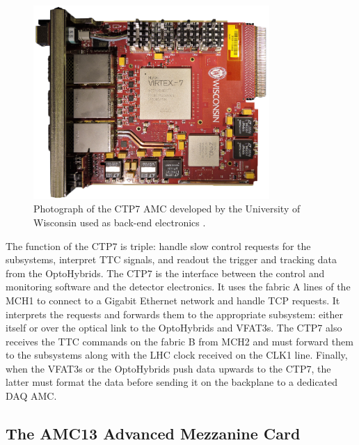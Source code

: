      \begin{figure}[t!]
        \centering
        \includegraphics[width=0.8\textwidth]{img/II-2-daq/ctp7.png}
        \caption{Photograph of the CTP7 AMC developed by the University of Wisconsin used as back-end electronics \cite{CTP7}.}
        \label{fig:II-2-ctp7}
      \end{figure}

      The function of the CTP7 is triple: handle slow control requests for the subsystems, interpret TTC signals, and readout the trigger and tracking data from the OptoHybrids. The CTP7 is the interface between the control and monitoring software and the detector electronics. It uses the fabric A lines of the MCH1 to connect to a Gigabit Ethernet network and handle TCP requests. It interprets the requests and forwards them to the appropriate subsystem: either itself or over the optical link to the OptoHybrids and VFAT3s. The CTP7 also receives the TTC commands on the fabric B from MCH2 and must forward them to the subsystems along with the LHC clock received on the CLK1 line. Finally, when the VFAT3s or the OptoHybrids push data upwards to the CTP7, the latter must format the data before sending it on the backplane to a dedicated DAQ AMC.

    \subsection{The AMC13 Advanced Mezzanine Card}

